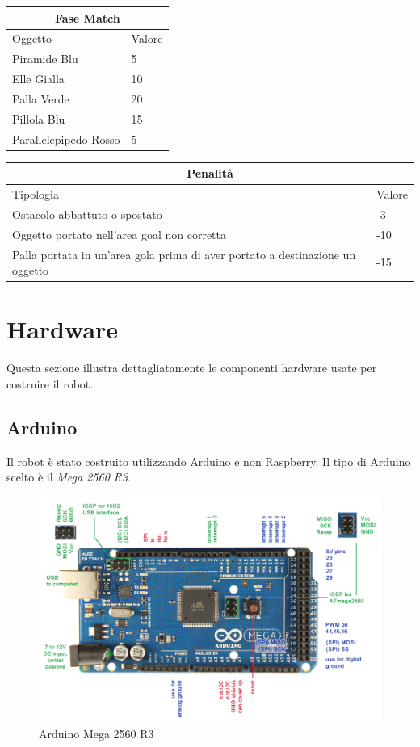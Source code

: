 \documentclass[a4paper,12pt,italian]{article}
\begin{document}
\begin{center}
	\begin{tabular}{ |p{5cm}||p{3cm}| }
 		\hline
 		\multicolumn{2}{|c|}{Fase Match} \\
 		\hline
 		Oggetto & Valore\\
 		\hline
		 Piramide Blu & 5\\
 		 Elle Gialla & 10\\
 		 Palla Verde & 20\\
 		 Pillola Blu & 15\\
 		 Parallelepipedo Rosso & 5\\
		\hline
	\end{tabular}
\end{center}

\begin{center}
	\begin{tabular}{ |p{5cm}||p{3cm}| }
 		\hline
 		\multicolumn{2}{|c|}{Penalità} \\
 		\hline
 		Tipologia & Valore\\
 		\hline
		 Ostacolo abbattuto o spostato & -3\\
 		 Oggetto portato nell'area goal non corretta & -10\\
 		 Palla portata in un'area gola prima di aver portato a destinazione un oggetto & -15\\
		\hline
	\end{tabular}
\end{center}

\pagebreak
\section{Hardware}
Questa sezione illustra dettagliatamente le componenti hardware usate per costruire il robot.

\subsection{Arduino}
Il robot è stato costruito utilizzando Arduino e non Raspberry. Il tipo di Arduino scelto è il \textit{Mega 2560 R3}.

\begin{figure}[H]
\begin{center}
\includegraphics[scale=0.6]{arduino}
\caption{Arduino Mega 2560 R3}
\label{Fig: arduino}
\end{center}
\end{figure}
\end{document}
